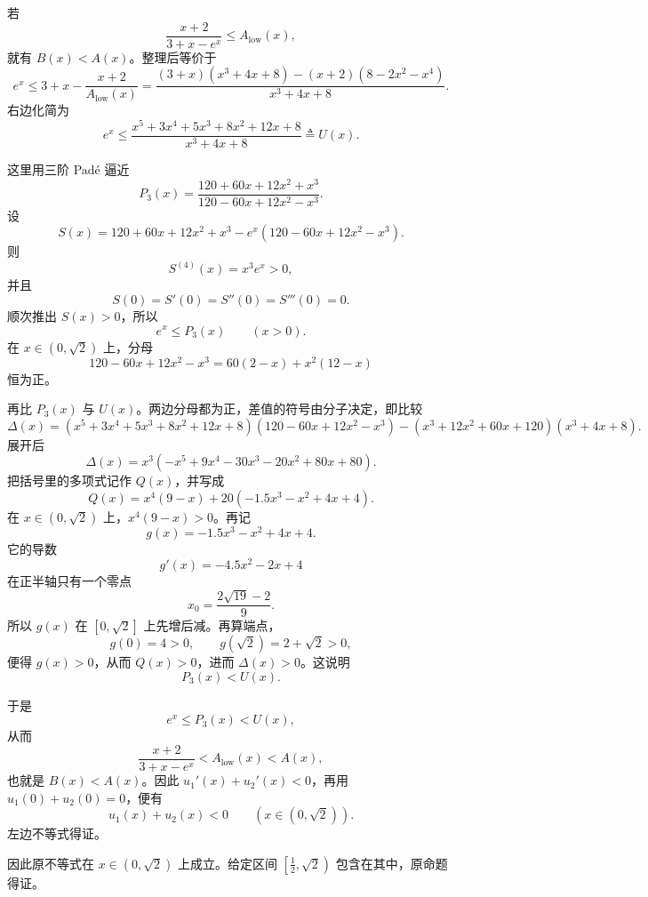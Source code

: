 \begin{solution}
若
\[
\frac{x+2}{3+x-e^x} \le A_{\text{low}}(x),
\]
就有 $B(x)<A(x)$。整理后等价于
$$ e^x \le 3+x - \frac{x+2}{A_{\text{low}}(x)} = \frac{(3+x)(x^3+4x+8) - (x+2)(8-2x^2-x^4)}{x^3+4x+8}. $$
右边化简为
$$ e^x \le \frac{x^5+3x^4+5x^3+8x^2+12x+8}{x^3+4x+8} \triangleq U(x). $$

这里用三阶 Padé 逼近
\[
P_3(x)=\frac{120+60x+12x^2+x^3}{120-60x+12x^2-x^3}.
\]
设
\[
S(x)=120+60x+12x^2+x^3-e^x(120-60x+12x^2-x^3).
\]
则
\[
S^{(4)}(x)=x^3e^x>0,
\]
并且
\[
S(0)=S'(0)=S''(0)=S'''(0)=0.
\]
顺次推出 $S(x)>0$，所以
\[
e^x\le P_3(x)\qquad(x>0).
\]
在 $x\in(0,\sqrt2)$ 上，分母
\[
120-60x+12x^2-x^3=60(2-x)+x^2(12-x)
\]
恒为正。

再比 $P_3(x)$ 与 $U(x)$。两边分母都为正，差值的符号由分子决定，即比较
$$ \Delta(x) = (x^5+3x^4+5x^3+8x^2+12x+8)(120-60x+12x^2-x^3) - (x^3+12x^2+60x+120)(x^3+4x+8). $$
展开后
$$ \Delta(x) = x^3(-x^5+9x^4-30x^3-20x^2+80x+80). $$
把括号里的多项式记作 $Q(x)$，并写成
\[
Q(x)=x^4(9-x)+20(-1.5x^3-x^2+4x+4).
\]
在 $x\in(0,\sqrt2)$ 上，$x^4(9-x)>0$。再记
\[
g(x)=-1.5x^3-x^2+4x+4.
\]
它的导数
\[
g'(x)=-4.5x^2-2x+4
\]
在正半轴只有一个零点
\[
x_0=\frac{2\sqrt{19}-2}{9}.
\]
所以 $g(x)$ 在 $[0,\sqrt2]$ 上先增后减。再算端点，
\[
g(0)=4>0,\qquad g(\sqrt2)=2+\sqrt2>0,
\]
便得 $g(x)>0$，从而 $Q(x)>0$，进而 $\Delta(x)>0$。这说明
\[
P_3(x)<U(x).
\]

于是
\[
e^x\le P_3(x)<U(x),
\]
从而
\[
\frac{x+2}{3+x-e^x}<A_{\text{low}}(x)<A(x),
\]
也就是 $B(x)<A(x)$。因此 $u_1'(x)+u_2'(x)<0$，再用 $u_1(0)+u_2(0)=0$，便有
\[
u_1(x)+u_2(x)<0\qquad(x\in(0,\sqrt2)).
\]
左边不等式得证。

因此原不等式在 $x\in(0,\sqrt2)$ 上成立。给定区间 $\left[\frac12,\sqrt2\right)$ 包含在其中，原命题得证。
\end{solution}


